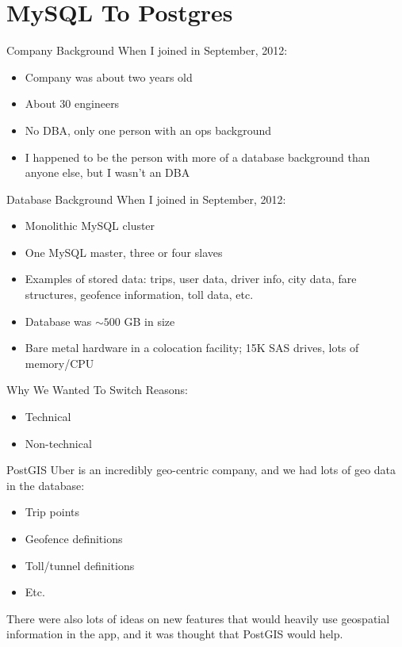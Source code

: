 \documentclass[14pt]{beamer}
\begin{document}
\section{MySQL To Postgres}

\begin{frame}{Company Background}
  When I joined in September, 2012:
  \begin{itemize}
    \item Company was about two years old
    \item About 30 engineers
    \item No DBA, only one person with an ops background
    \item I happened to be the person with more of a database background than
      anyone else, but I wasn't an DBA
  \end{itemize}
\end{frame}

\begin{frame}{Database Background}
  When I joined in September, 2012:
  \begin{itemize}
    \item Monolithic MySQL cluster
    \item One MySQL master, three or four slaves
    \item Examples of stored data: trips, user data, driver info, city data,
      fare structures, geofence information, toll data, etc.
    \item Database was $\sim500$ GB in size
    \item Bare metal hardware in a colocation facility; 15K SAS drives, lots of
      memory/CPU
  \end{itemize}
\end{frame}

\begin{frame}{Why We Wanted To Switch}
  Reasons:
  \begin{itemize}
  \item Technical
  \item Non-technical
    \end{itemize}
\end{frame}

\begin{frame}{PostGIS}
  Uber is an incredibly geo-centric company, and we had lots of geo data in the
  database:
  \begin{itemize}
    \item Trip points
    \item Geofence definitions
    \item Toll/tunnel definitions
    \item Etc.
  \end{itemize}
  There were also lots of ideas on new features that would heavily use
  geospatial information in the app, and it was thought that PostGIS would help.
\end{frame}
\end{document}
